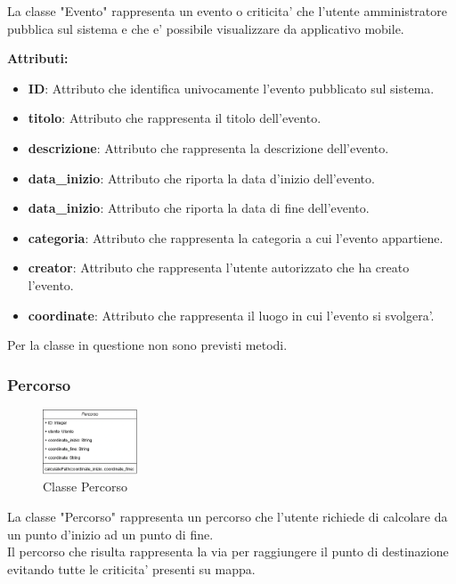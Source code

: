 \documentclass{article}
\begin{document}
La classe "Evento" rappresenta un evento o criticita' che l'utente amministratore pubblica sul sistema e che e' possibile visualizzare da applicativo mobile.

\textbf{Attributi:}\\
\begin{itemize}
    \item \textbf{ID}: Attributo che identifica univocamente l'evento pubblicato sul sistema.
    \item \textbf{titolo}: Attributo che rappresenta il titolo dell'evento.
    \item \textbf{descrizione}: Attributo che rappresenta la descrizione dell'evento.
    \item \textbf{data\_inizio}: Attributo che riporta la data d'inizio dell'evento.
    \item \textbf{data\_inizio}: Attributo che riporta la data di fine dell'evento.
    \item \textbf{categoria}: Attributo che rappresenta la categoria a cui l'evento appartiene.
    \item \textbf{creator}: Attributo che rappresenta l'utente autorizzato che ha creato l'evento.
    \item \textbf{coordinate}: Attributo che rappresenta il luogo in cui l'evento si svolgera'.\\
\end{itemize}
Per la classe in questione non sono previsti metodi.

\clearpage 

\subsubsection{Percorso}

\begin{figure}[htbp]
    \centering
    \includegraphics[width=0.25\textwidth]{Images/percorso_class.png}
    \caption{Classe Percorso}
    \label{fig:percorso}
\end{figure}

La classe "Percorso" rappresenta un percorso che l'utente richiede di calcolare da un punto d'inizio ad un punto di fine.\\
Il percorso che risulta rappresenta la via per raggiungere il punto di destinazione evitando tutte le criticita' presenti su mappa.\\
\end{document}
